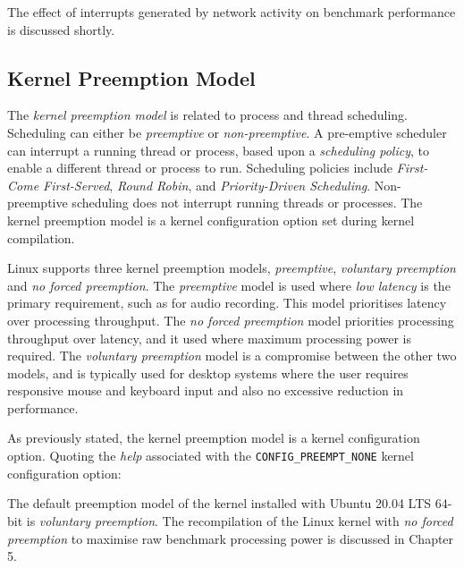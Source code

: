 The effect of interrupts generated by network activity on benchmark performance is discussed shortly.


\subsection{Kernel Preemption Model}

The \emph{kernel preemption model} is related to process and thread scheduling. Scheduling can either be \emph{preemptive} or \emph{non-preemptive}. A pre-emptive scheduler can interrupt a running thread or process, based upon a \emph{scheduling policy}, to enable a different thread or process to run. Scheduling policies include \emph{First-Come First-Served}, \emph{Round Robin}, and \emph{Priority-Driven Scheduling}. Non-preemptive scheduling does not interrupt running threads or processes. The kernel preemption model is a kernel configuration option set during kernel compilation.

Linux supports three kernel preemption models, \emph{preemptive}, \emph{voluntary preemption} and \emph{no forced preemption}. The \emph{preemptive} model is used where \emph{low latency} is the primary requirement, such as for audio recording. This model prioritises latency over processing throughput. The \emph{no forced preemption} model priorities processing throughput over latency, and it used where maximum processing power is required. The \emph{voluntary preemption} model is a compromise between the other two models, and is typically used for desktop systems where the user requires responsive mouse and keyboard input and also no excessive reduction in performance.

As previously stated, the kernel preemption model is a kernel configuration option. Quoting the \emph{help} associated with the \verb|CONFIG_PREEMPT_NONE| kernel configuration option:


The default preemption model of the kernel installed with Ubuntu 20.04 LTS 64-bit is \emph{voluntary preemption}. The recompilation of the Linux kernel with \emph{no forced preemption} to maximise raw benchmark processing power is discussed in Chapter 5.  



